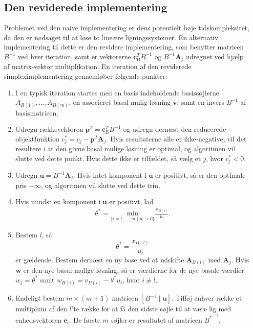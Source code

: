 \subsection{Den reviderede implementering}
Problemet ved den naive implementering er dens potentielt høje tidskompleksitet, da den er nødsaget til at løse to lineære ligningssystemer.
En alternativ implementering til dette er den revidere implementering, som benytter matricen $B^{-1}$ ved hver iteration, samt er vektorerne $\mathbf{c}_{\text{B}}^T B^{-1}$ og $B^{-1} \mathbf{A}_j$ udregnet ved hjælp af matrix-vektor multiplikation.
En iteration af den reviderede simpleximplementering gennemløber følgende punkter: 
% 
\begin{tcolorbox}[
title=Den reviderede implementering,
colback		= myblue!15,
colframe	= myblue!15,
coltitle	= black,
before skip	= 20pt plus 2pt,
after skip	= 20pt plus 2pt,
fonttitle	= \bfseries]
\begin{enumerate}
\item I en typisk iteration startes med en basis indeholdende basissøjlerne $A_{B(1)},\ldots,A_{B(m)}$, en associeret basal mulig løsning $\mathbf{v}$, samt en invers $B^{-1}$ af basismatricen. 
\item Udregn rækkevektoren $\mathbf{p}^T=\mathbf{c}_{\text{B}}^T B^{-1}$ og udregn dernæst den reducerede objektfunktion $c_j^* = c_j - \mathbf{p}^T \mathbf{A}_j$.
Hvis resultaterne alle er ikke-negative, vil det resultere i at den givne basal mulige løsning er optimal, og algoritmen vil slutte ved dette punkt. Hvis dette ikke er tilfældet, så vælg et $j$, hvor $c_j^* < 0$.
\item Udregn $\mathbf{u}=B^{-1}\mathbf{A}_j$.
Hvis intet komponent i $\mathbf{u}$ er positivt, så er den optimale pris $-\infty$, og algoritmen vil slutte ved dette trin. 
%
%
\item Hvis mindst en komponent i $\mathbf{u}$ er positivt, lad 
\begin{align*}
\theta^*=\underset{\{i=1,\ldots,m \mid u_i>0\}}{\text{min}}\frac{x_{B(i)}}{u_i}.
\end{align*}
\item Bestem $l$, så $$\theta^*=\frac{x_{B(l)}}{u_l}$$ er gældende. Bestem dernæst en ny base ved at udskifte $\mathbf{A}_{B(l)}$ med $\mathbf{A}_j$. Hvis $\mathbf{w}$ er den nye basal mulige løsning, så er værdierne for de nye basale værdier $w_j=\theta^*$ samt $w_{B(i)}=v_{B(i)}-\theta^*u_i$, hvor $i \neq l$.
\item Endeligt bestem $m \times (m+1)$ matricen $\left [B^{-1} \mid \mathbf{u} \right ]$.
Tilføj enhver række et multiplum af den $l$'te række for at få den sidste søjle til at være lig med enhedsvektoren $\mathbf{e}_l$.
De første $m$ søjler er resultatet af matricen ${B^*}^{-1}$.
\end{enumerate}
\end{tcolorbox}
\noindent
%
%
